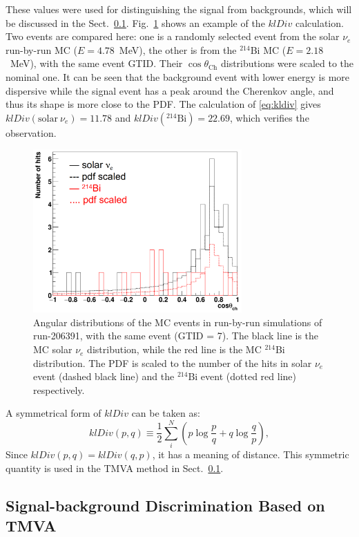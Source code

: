 These values were used for distinguishing the signal from backgrounds, which will be discussed in the Sect.~\ref{sect:tmva}. Fig.~\ref{kLdiv_example} shows an example of the $klDiv$ calculation. Two events are compared here: one is a randomly selected event from the solar $\nu_e$ run-by-run MC ($E=4.78$~MeV), the other is from the $^{214}$Bi MC ($E=2.18$~MeV), with the same event GTID. Their $\cos\theta_\mathrm{Ch}$ distributions were scaled to the nominal one. It can be seen that the background event with lower energy is more dispersive while the signal event has a peak around the Cherenkov angle, and thus its shape is more close to the PDF. The calculation of \ref{eq:kldiv} gives $klDiv(\mathrm{solar}~\nu_e)=11.78$ and $klDiv(^{214}\mathrm{Bi})=22.69$, which verifies the observation.

\begin{figure}[!htb]
	\centering
	\includegraphics[width=8cm]{klDiv_example.png}
	\caption[Angular distributions of the MC events in run-by-run simulations.]{Angular distributions of the MC events in run-by-run simulations of run-206391, with the same event (GTID = 7). The black line is the MC solar $\nu_e$ distribution, while the red line is the MC $^{214}$Bi distribution. The PDF is scaled to the number of the hits in solar $\nu_e$ event (dashed black line) and the $^{214}$Bi event (dotted red line) respectively.}
	\label{kLdiv_example}
\end{figure}

A symmetrical form of $klDiv$ can be taken as:
\begin{equation}\label{eq:symKlDiv}
klDiv(p,q) \equiv \frac{1}{2}\sum_{i}^N (p\log{\frac{p}{q}}+q\log{\frac{q}{p}}),
\end{equation}
Since $klDiv(p,q)=klDiv(q,p)$, it has a meaning of distance. This symmetric quantity is used in the TMVA method in Sect.~\ref{sect:tmva}.

\subsection{Signal-background Discrimination Based on TMVA}\label{sect:tmva}

